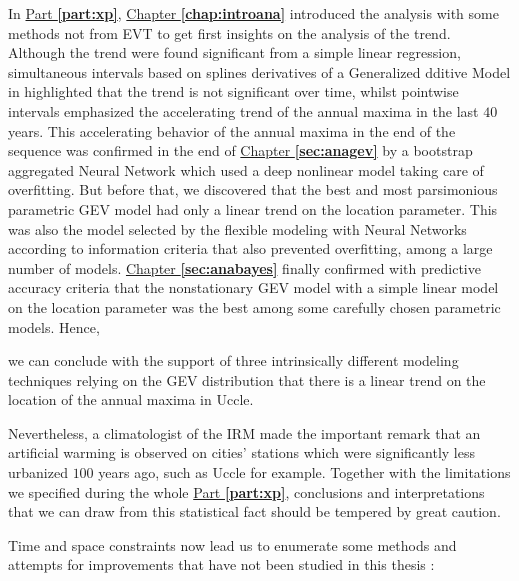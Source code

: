 \documentclass[11pt,a4paper,openany, twosided]{book}
\begin{document}
In \hyperref[part:xp]{Part \textbf{\ref{part:xp}}},  \hyperref[chap:introana]{Chapter \textbf{\ref{chap:introana}}} introduced the analysis with some methods not from EVT to get first insights on the analysis of the trend. Although the trend were found significant from a simple linear regression, simultaneous intervals based on splines derivatives of a Generalized dditive Model in highlighted that the trend is not significant over time, whilst pointwise intervals emphasized the accelerating trend of the annual maxima in the last $40$ years. This accelerating behavior of the annual maxima in the end of the sequence was confirmed in the end of \hyperref[sec:anagev]{Chapter \textbf{\ref{sec:anagev}}} by a bootstrap aggregated Neural Network which used a deep nonlinear model taking care of overfitting. But before that, we discovered that the best and most parsimonious parametric GEV model had only a linear trend on the location parameter. This was also the model selected by the flexible modeling with Neural Networks according to information criteria that also prevented overfitting, among a large number of models. \hyperref[sec:anabayes]{Chapter \textbf{\ref{sec:anabayes}}} finally confirmed  with predictive accuracy criteria that the nonstationary GEV model with a simple linear model on the location parameter was the best among some carefully chosen parametric models. Hence,
\vspace{.2cm}
\begin{tcolorbox}
	we can conclude with the support of three intrinsically different modeling techniques relying on the GEV distribution that there is a linear trend on the location of the annual maxima in Uccle.
\end{tcolorbox}
Nevertheless, a climatologist of the IRM made the important remark that an artificial warming is observed on cities' stations which were significantly less urbanized $100$ years ago, such as Uccle for example. Together with the limitations we specified during the whole \hyperref[part:xp]{Part \textbf{\ref{part:xp}}}, conclusions and interpretations that we can draw from this statistical fact should be tempered by great caution.
\newline

Time and space constraints now lead us to enumerate some methods and attempts for improvements that have not been studied in this thesis : 
\end{document}
